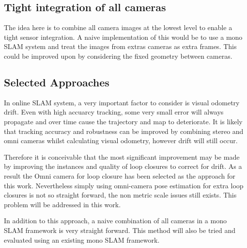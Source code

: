 \subsection{Tight integration of all cameras}

The idea here is to combine all camera images at the lowest level to enable a tight sensor integration.  A naive implementation of this would be to use a mono SLAM system and treat the images from extras cameras as extra frames.  This could be improved upon by considering the fixed geometry between cameras.

\subsection{Selected Approaches}

In online SLAM system, a very important factor to consider is visual odometry drift.  Even with high accuarcy tracking, some very small error will always propagate and over time cause the trajectory and map to deteriorate. It is likely that tracking accuracy and robustness can be improved by combining stereo and omni cameras whilst calculating visual odometry, however drift will still occur.

Therefore it is conceivable that the most significant improvement may be made by improving the instances and quality of loop closures to correct for drift.  As a result the Omni camera for loop closure has been selected as the approach for this work.  Nevertheless simply using omni-camera pose estimation for extra loop closures is not so straight forward, the non metric scale issues still exists.  This problem will be addressed in this work.

In addition to this approach, a naive combination of all cameras in a mono SLAM framework is very straight forward.  This method will also be tried and evaluated using an existing mono SLAM framework.